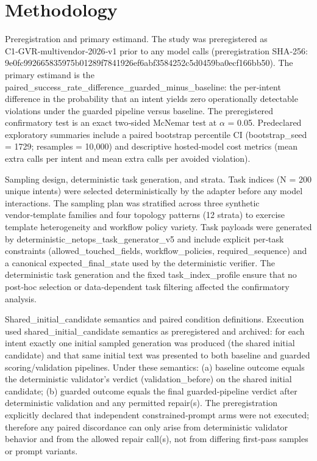 \documentclass[conference]{IEEEtran}
\begin{document}
\section{Methodology}
Preregistration and primary estimand. The study was preregistered as C1‑GVR‑multivendor‑2026‑v1 prior to any model calls (preregistration SHA‑256: 9e0fc992\allowbreak{}66583597\allowbreak{}5b01289f\allowbreak{}7841926e\allowbreak{}f6abf358\allowbreak{}4252c5d0\allowbreak{}459ba0ec\allowbreak{}f166bb50). The primary estimand is the paired\_success\_rate\_difference\_guarded\_minus\_baseline: the per‑intent difference in the probability that an intent yields zero operationally detectable violations under the guarded pipeline versus baseline. The preregistered confirmatory test is an exact two‑sided McNemar test at \ensuremath{\alpha} = 0.05. Predeclared exploratory summaries include a paired bootstrap percentile CI (bootstrap\_seed = 1729; resamples = 10,000) and descriptive hosted‑model cost metrics (mean extra calls per intent and mean extra calls per avoided violation).

Sampling design, deterministic task generation, and strata. Task indices (N = 200 unique intents) were selected deterministically by the adapter before any model interactions. The sampling plan was stratified across three synthetic vendor‑template families and four topology patterns (12 strata) to exercise template heterogeneity and workflow policy variety. Task payloads were generated by deterministic\_netops\_task\_generator\_v5 and include explicit per‑task constraints (allowed\_touched\_fields, workflow\_policies, required\_sequence) and a canonical expected\_final\_state used by the deterministic verifier. The deterministic task generation and the fixed task\_index\_profile ensure that no post‑hoc selection or data‑dependent task filtering affected the confirmatory analysis.

Shared\_initial\_candidate semantics and paired condition definitions. Execution used shared\_initial\_candidate semantics as preregistered and archived: for each intent exactly one initial sampled generation was produced (the shared initial candidate) and that same initial text was presented to both baseline and guarded scoring/validation pipelines. Under these semantics: (a) baseline outcome equals the deterministic validator's verdict (validation\_before) on the shared initial candidate; (b) guarded outcome equals the final guarded‑pipeline verdict after deterministic validation and any permitted repair(s). The preregistration explicitly declared that independent constrained‑prompt arms were not executed; therefore any paired discordance can only arise from deterministic validator behavior and from the allowed repair call(s), not from differing first‑pass samples or prompt variants.
\end{document}
